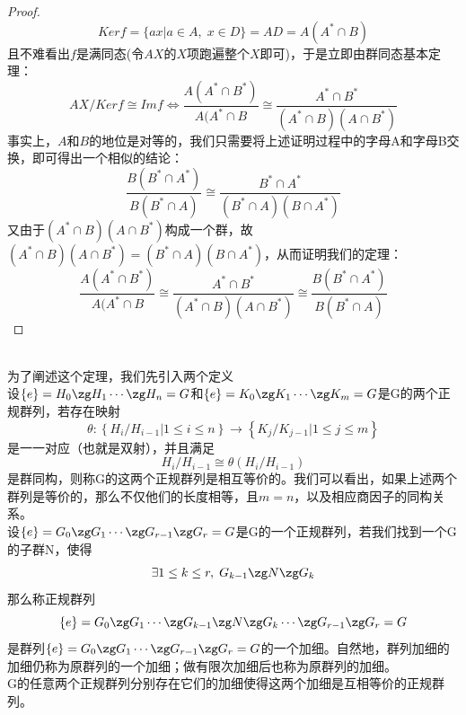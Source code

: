 \begin{proof}
\[
Kerf=\{ax|a\in A,\; x\in D\}=AD=A(A^*\cap B)
\]
且不难看出$f$是满同态(令$AX$的$X$项跑遍整个$X$即可)，于是立即由群同态基本定理：
\[
AX/Kerf\cong Imf \iff \frac{A(A^*\cap B^*)}{A(A^*\cap B}\cong \frac{A^*\cap B^*}{(A^*\cap B)(A\cap B^*)}
\]
事实上，$A$和$B$的地位是对等的，我们只需要将上述证明过程中的字母A和字母B交换，即可得出一个相似的结论：
\[
\frac{B(B^*\cap A^*)}{B(B^*\cap A)}\cong \frac{B^*\cap A^*}{(B^*\cap A)(B\cap A^*)}
\]
又由于$(A^*\cap B)(A\cap B^*)$构成一个群，故$(A^*\cap B)(A\cap B^*)=(B^*\cap A)(B\cap A^*)$，从而证明我们的定理：
\[
\frac{A(A^*\cap B^*)}{A(A^*\cap B}\cong \frac{A^*\cap B^*}{(A^*\cap B)(A\cap B^*)}\cong\frac{B(B^*\cap A^*)}{B(B^*\cap A)}
\]
\end{proof}
\\
为了阐述这个定理，我们先引入两个定义\\
设$\{e\}=H_0\zg H_1\cdots \zg H_n=G$和$\{e\}=K_0\zg K_1\cdots \zg K_m=G$是G的两个正规群列，若存在映射
\[
\theta\colon \left\{H_i/H_{i-1}|1\leq i\leq n\right\}\to \left\{K_j/K_{j-1}|1\leq j\leq m\right\}
\]
是一一对应（也就是双射），并且满足
\[
H_i/H_{i-1}\cong \theta(H_i/H_{i-1})
\]
是群同构，则称G的这两个正规群列是相互等价的。我们可以看出，如果上述两个群列是等价的，那么不仅他们的长度相等，且$m=n$，以及相应商因子的同构关系。\\
设$\{e\}=G_0\zg G_1\cdots \zg G_{r-1}\zg G_r=G$是G的一个正规群列，若我们找到一个G的子群N，使得
\[
\exists 1\leq k\leq r,\; G_{k-1}\zg N\zg G_k
\]
那么称正规群列
\[
\{e\}=G_0\zg G_1\cdots\zg G_{k-1}\zg N\zg G_k\cdots \zg G_{r-1}\zg G_r=G
\]
是群列$\{e\}=G_0\zg G_1\cdots \zg G_{r-1}\zg G_r=G$的一个加细。自然地，群列加细的加细仍称为原群列的一个加细；做有限次加细后也称为原群列的加细。\\
G的任意两个正规群列分别存在它们的加细使得这两个加细是互相等价的正规群列。

